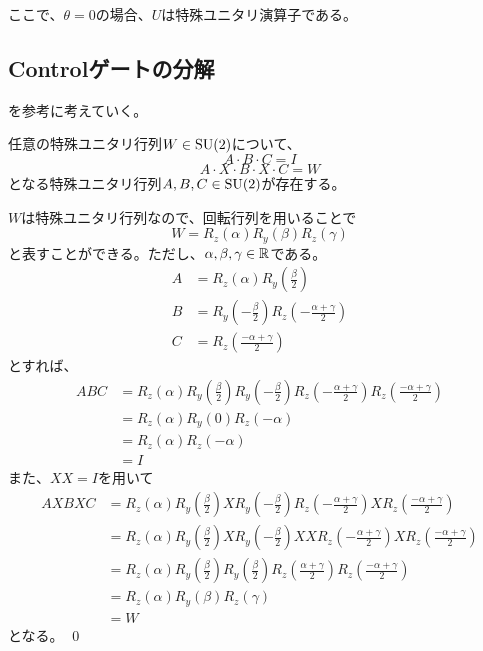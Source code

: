 ここで、$\theta = 0$の場合、$U$は特殊ユニタリ演算子である。

\subsection{Controlゲートの分解}
\cite{barenco1995elementary}を参考に考えていく。
\begin{Theorem} \label{theorem:AXBXC}
任意の特殊ユニタリ行列$W\in \text{SU}(2)$について、
\begin{equation}
  A \cdot B \cdot C = I
\end{equation}
\begin{equation}
  A \cdot X \cdot B \cdot X \cdot C = W
\end{equation}
となる特殊ユニタリ行列$A,B,C\in \text{SU}(2)$が存在する。
\end{Theorem}
\proof
  $W$は特殊ユニタリ行列なので、回転行列を用いることで
  \begin{equation}
    W = R_z(\alpha)R_y(\beta)R_z(\gamma)
  \end{equation}
  と表すことができる。ただし、$\alpha,\beta,\gamma\in\mathbb{R}$である。
  \begin{align}
    A &= R_z(\alpha)R_y\left(\frac{\beta}{2}\right) \\
    B &= R_y\left(-\frac{\beta}{2}\right)R_z\left(-\frac{\alpha+\gamma}{2}\right) \\
    C &= R_z\left(\frac{-\alpha+\gamma}{2}\right)
  \end{align}
  とすれば、
  \begin{align}
    ABC &= R_z(\alpha)R_y\left(\frac{\beta}{2}\right)R_y\left(-\frac{\beta}{2}\right)R_z\left(-\frac{\alpha+\gamma}{2}\right)R_z\left(\frac{-\alpha+\gamma}{2}\right) \\
    &= R_z(\alpha)R_y(0)R_z(-\alpha) \\
    &= R_z(\alpha)R_z(-\alpha) \\
    &= I
  \end{align}
  また、$XX = I$を用いて
  \begin{align}
    AXBXC &= R_z(\alpha)R_y\left(\frac{\beta}{2}\right)XR_y\left(-\frac{\beta}{2}\right)R_z\left(-\frac{\alpha+\gamma}{2}\right)XR_z\left(\frac{-\alpha+\gamma}{2}\right) \\
    &= R_z(\alpha)R_y\left(\frac{\beta}{2}\right)XR_y\left(-\frac{\beta}{2}\right)XXR_z\left(-\frac{\alpha+\gamma}{2}\right)XR_z\left(\frac{-\alpha+\gamma}{2}\right) \\
    &= R_z(\alpha)R_y\left(\frac{\beta}{2}\right)R_y\left(\frac{\beta}{2}\right)R_z\left(\frac{\alpha+\gamma}{2}\right)R_z\left(\frac{-\alpha+\gamma}{2}\right) \\
    &= R_z(\alpha)R_y(\beta)R_z(\gamma) \\
    &= W
  \end{align}
  となる。
\qed

